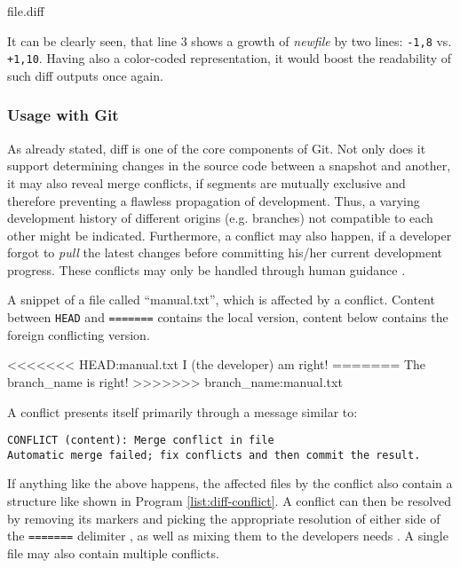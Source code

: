 \begin{program}
  \caption{file.diff}
  \label{list:diff-explanation}

\end{program}

It can be clearly seen, that line 3 shows a growth of \emph{newfile} by two lines: \texttt{-1,8} vs. \texttt{+1,10}. Having also a color-coded representation, it would boost the readability of such diff outputs once again.


\subsubsection{Usage with Git}
As already stated, diff is one of the core components of Git. Not only does it support determining changes in the source code between a snapshot and another, it may also reveal merge conflicts, if segments are mutually exclusive and therefore preventing a flawless propagation of development. Thus, a varying development history of different origins (e.g. branches) not compatible to each other might be indicated. Furthermore, a conflict may also happen, if a developer forgot to \emph{pull} the latest changes before committing his/her current development progress. These conflicts may only be handled through human guidance \cite[124]{loeliger2012version}.

\begin{program}
  \caption{A snippet of a file called ``manual.txt'', which is affected by a conflict. Content between \texttt{HEAD} and \texttt{=======} contains the local version, content below contains the foreign conflicting version.}
  \label{list:diff-conflict}
\begin{GenericCode}
<<<<<<< HEAD:manual.txt
I (the developer) am right!
=======
The branch_name is right!
>>>>>>> branch_name:manual.txt
\end{GenericCode}
\end{program}

A conflict presents itself primarily through a message similar to:
\begin{center}
  \texttt{CONFLICT (content): Merge conflict in file\\
Automatic merge failed; fix conflicts and then commit the result.}
\end{center}
If anything like the above happens, the affected files by the conflict also contain a structure like shown in Program \ref{list:diff-conflict}. A conflict can then be resolved by removing its markers and picking the appropriate resolution of either side of the \texttt{=======} delimiter \cite{GitConflicts}, as well as mixing them to the developers needs \cite[126]{loeliger2012version}. A single file may also contain multiple conflicts.

